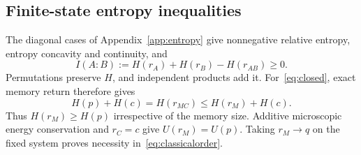 \subsection{Finite-state entropy inequalities}
The diagonal cases of Appendix~\ref{app:entropy} give nonnegative relative entropy, entropy concavity and continuity, and
\begin{equation}
 I(A:B):=H(r_A)+H(r_B)-H(r_{AB})\ge0. \label{eq:classicalMI}
\end{equation}
Permutations preserve $H$, and independent products add it. For~\eqref{eq:closed}, exact memory return therefore gives
\begin{equation}
 H(p)+H(c)=H(r_{MC})\le H(r_M)+H(c). \label{eq:classicalbalance}
\end{equation}
Thus $H(r_M)\ge H(p)$ irrespective of the memory size. Additive microscopic energy conservation and $r_C=c$ give $U(r_M)=U(p)$. Taking $r_M\to q$ on the fixed system proves necessity in~\eqref{eq:classicalorder}.

